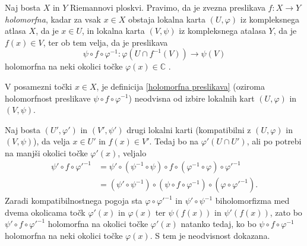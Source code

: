 \documentclass[mat1]{fmfdelo}
\numberwithin{equation}{section}
\newcommand{\C}{\mathbb C}
\newcommand{\inv}{^{-1}}
\theoremstyle{definition}
\begin{document}


\begin{definicija}
    \label{holomorfna preslikava}
    Naj bosta $X$ in $Y$ Riemannovi ploskvi. Pravimo, da je zvezna preslikava $f:X \to Y$ \emph{holomorfna}, kadar za vsak $x \in X$ obstaja lokalna karta $(U, \varphi)$ iz kompleksnega atlasa $X$, da je $x \in U$, in lokalna karta $(V, \psi)$ iz kompleksnega atalasa $Y$, da je $f(x) \in V$, ter ob tem velja, da je preslikava  
    \[
        \psi \circ f \circ \varphi\inv : \varphi(U \cap f\inv(V)) \to \psi(V)
    \]
    holomorfna na neki okolici točke $\varphi(x) \in \C$ .
\end{definicija}

\begin{trditev}
    V posamezni točki $x \in X$, je definicija \ref{holomorfna preslikava} (oziroma holomorfnost preslikave $\psi \circ f \circ \varphi\inv$) neodvisna od izbire lokalnih kart $(U, \varphi)$ in $(V, \psi)$. 
\end{trditev}

\begin{dokaz}
    Naj bosta $(U', \varphi')$ in $(V', \psi')$ drugi lokalni karti (kompatibilni z $(U, \varphi)$ in $(V, \psi)$), da velja $x \in U'$ in $f(x) \in V'$. Tedaj bo na $\varphi'(U \cap U')$, ali po potrebi na manjši okolici točke $\varphi'(x)$, veljalo
    \begin{align*}    
        \psi' \circ f \circ {\varphi'}\inv &= 
        \psi' \circ (\psi\inv \circ \psi) \circ f \circ (\varphi\inv \circ \varphi) \circ {\varphi'}\inv \\
        &= (\psi' \circ \psi\inv) \circ (\psi \circ f \circ \varphi\inv) \circ (\varphi \circ {\varphi'}\inv).
    \end{align*}
    Zaradi kompatibilnostnega pogoja sta $\varphi \circ {\varphi'}\inv$ in $\psi' \circ \psi\inv$ biholomorfizma med dvema okolicama točk $\varphi'(x)$ in $\varphi(x)$ ter $\psi(f(x))$ in $\psi'(f(x))$, zato bo $\psi' \circ f \circ {\varphi'}\inv$ holomorfna na okolici točke $\varphi'(x)$ natanko tedaj, ko bo $\psi \circ f \circ \varphi\inv$ holomorfna na neki okolici točke $\varphi(x)$. S tem je neodvisnost dokazana. 
\end{dokaz}
\end{document}
